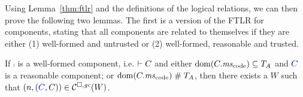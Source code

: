 %
Using Lemma~\ref{thm:ftlr} and the definitions of the logical relations, we can then prove the following two lemmas.
The first is a version of the FTLR for components, stating that all components are related to themselves if they are either (1) well-formed and untrusted or (2) well-formed, reasonable and trusted.
\begin{lemma}
  \label{lem:ftlr-comps}
  If $\comp$ is a well-formed component, i.e. $ \vdash C$ and either
    $\dom(\comp.\mscode) \subseteq \ta$ and ${\color{blue} C}$ is a reasonable component; or
    $\dom(\comp.\mscode) \mathrel{\#} \ta$,
  then there exists a $W$ such that
  $\left(n,({\color{blue} C},C)\right) \in \mathcal{C}^{\square,\mathit{gc}}(W)$.
\end{lemma}

